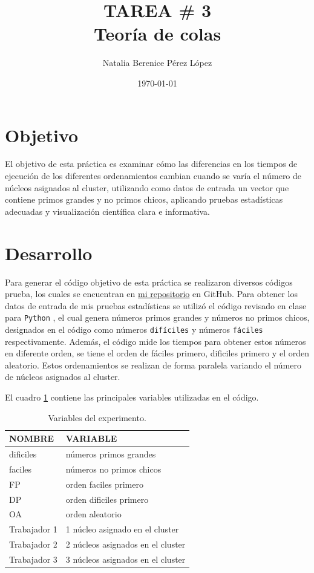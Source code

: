 \documentclass{article}
\title{TAREA \# 3 \\ Teoría de colas} %
\author{Natalia Berenice P\'{e}rez L\'{o}pez} %
\date{\today}
\begin{document}

\maketitle %

\section{Objetivo}
El objetivo de esta práctica es examinar cómo las diferencias en los tiempos de ejecución de los diferentes ordenamientos cambian cuando se varía el número de núcleos asignados al cluster, utilizando como datos de entrada un vector que contiene primos grandes y no primos chicos, aplicando pruebas estadísticas adecuadas y visualización científica clara e informativa.

\section{Desarrollo} %
Para generar el código objetivo de esta práctica se realizaron diversos códigos prueba, los cuales se encuentran en \href{https://github.com/nataliaperez0/Simulation/tree/main/Tarea3}{mi repositorio}  en GitHub. Para obtener los datos de entrada de mis pruebas estadísticas se utilizó el código revisado en clase para \texttt{Python} \citep{1}, el cual genera números primos grandes y números no primos chicos, designados en el código como números \texttt{difíciles} y números \texttt{fáciles} respectivamente. Además, el código mide los tiempos para obtener estos números en diferente orden, se tiene el orden de fáciles primero, dificiles primero y el orden aleatorio. Estos ordenamientos se realizan de forma paralela variando el número de núcleos asignados al cluster.
\bigskip

El cuadro  \ref{Cuadro 1} contiene las principales variables utilizadas en el código.

\begin{table}[ht]
\centering
\caption{Variables del experimento.}
\smallskip

 \begin{tabular}{ |p{3cm}|p{5cm}|}
 \hline
 NOMBRE & VARIABLE \\
 \hline
 dificiles       & números primos grandes \\
 \hline
 faciles    & números no primos chicos \\
 \hline
 FP & orden faciles primero \\
 \hline
 DP & orden dificiles primero \\
 \hline
 OA & orden aleatorio \\
 \hline
 Trabajador 1 & 1 núcleo asignado en el cluster \\
 \hline
 Trabajador 2 & 2 núcleos asignados en el cluster \\
 \hline
 Trabajador 3 & 3 núcleos asignados en el cluster \\
 \hline
\end{tabular}
\label{Cuadro 1}
\end{table}
\end{document}
